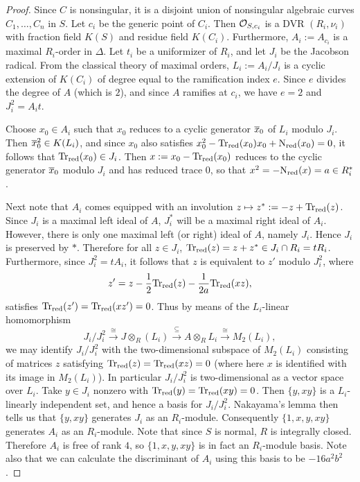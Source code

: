 \begin{proof}
Since $C$ is nonsingular, it is a disjoint union of nonsingular algebraic curves $C_1,\dots, C_n$ in $S$.  Let $c_i$ be the generic point of $C_i$.  Then $\mathcal{O}_{S,c_i}$ is a DVR $(R_i,\nu_i)$ with fraction field $K(S)$ and residue field $K(C_i)$.  Furthermore, $A_i := A_{c_i}$ is a maximal $R_i$-order in $\Delta$.  Let $t_i$ be a uniformizer of $R_i$, and let $J_i$ be the Jacobson radical.  From the classical theory of maximal orders, $L_i := A_i/J_i$ is a cyclic extension of $K(C_i)$ of degree equal to the ramification index $e$.  Since $e$ divides the degree of $A$ (which is $2$), and since $A$ ramifies at $c_i$, we have $e=2$ and $J_i^2 = A_it$.

Choose $x_0\in A_i$ such that $x_0$ reduces to a cyclic generator $\overline{x}_0$ of $L_i$ modulo $J_i$.  Then $\overline{x}_0^2\in K(L_i)$, and since $x_0$ also satisfies $x_0^2 - \textnormal{Tr}_{\text{red}}(x_0)x_0 + \textnormal{N}_{\text{red}}(x_0) = 0$, it follows that $\textnormal{Tr}_{\text{red}}(x_0)\in J_i$.  Then $x := x_0-\textnormal{Tr}_{\text{red}}(x_0)$ reduces to the cyclic generator $\overline{x}_0$ modulo $J_i$ and has reduced trace $0$, so that $x^2 = -\textnormal{N}_{\text{red}}(x) = a\in R_i^*$.

Next note that $A_i$ comes equipped with an involution $z\mapsto z^* := -z + \textnormal{Tr}_{\text{red}}(z)$.  Since $J_i$ is a maximal left ideal of $A$, $J_i^*$ will be a maximal right ideal of $A_i$.  However, there is only one maximal left (or right) ideal of $A$, namely $J_i$.  Hence $J_i$ is preserved by $*$.  Therefore for all $z\in J_i$, $\textnormal{Tr}_{\text{red}}(z) = z + z^* \in J_i\cap R_i = tR_i$.  Furthermore, since $J_i^2 = tA_i$, it follows that $z$ is equivalent to $z'$ modulo $J_i^2$, where
$$z' = z - \frac{1}{2}\textnormal{Tr}_{\text{red}}(z) - \frac{1}{2a}\textnormal{Tr}_{\text{red}}(xz),$$
satisfies $\textnormal{Tr}_{\text{red}}(z') = \textnormal{Tr}_{\text{red}}(xz') = 0$.  Thus by means of the $L_i$-linear homomorphism
$$J_i/J_i^2\xrightarrow{\cong} J\otimes_R (L_i)\xrightarrow{\subseteq} A\otimes_R L_i\xrightarrow{\cong} M_2(L_i),$$
we may identify $J_i/J_i^2$ with the two-dimensional subspace of $M_2(L_i)$ consisting of matrices $z$ satisfying $\textnormal{Tr}_{\text{red}}(z) = \textnormal{Tr}_{\text{red}}(xz) = 0$ (where here $x$ is identified with its image in $M_2(L_i)$).  In particular $J_i/J_i^2$ is two-dimensional as a vector space over $L_i$.  Take $y\in J_i$ nonzero with $\textnormal{Tr}_{\text{red}}(y) = \textnormal{Tr}_{\text{red}}(xy) = 0$.  Then $\{y,xy\}$ is a $L_i$-linearly independent set, and hence a basis for $J_i/J_i^2$.  Nakayama's lemma then tells us that $\{y,xy\}$ generates $J_i$ as an $R_i$-module.  Consequently $\{1,x,y,xy\}$ generates $A_i$ as an $R_i$-module.  Note that since $S$ is normal, $R$ is integrally closed.  Therefore $A_i$ is free of rank $4$, so $\{1,x,y,xy\}$ is in fact an $R_i$-module basis.  Note also that we can calculate the discriminant of $A_i$ using this basis to be $-16a^2b^2$.


\end{proof}
